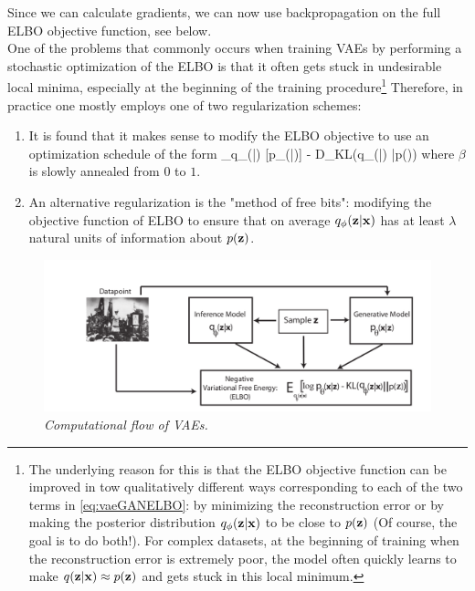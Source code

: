 Since we can calculate gradients, we can now use backpropagation on the full ELBO objective function, see below.\\
One of the problems that commonly occurs when training VAEs by performing a stochastic optimization of the ELBO is that it often gets stuck in undesirable local minima, especially at the beginning of the training procedure\footnote{The underlying reason for this is that the ELBO objective function can be improved in tow qualitatively different ways corresponding to each of the two terms in \ref{eq:vaeGANELBO}: by minimizing the reconstruction error or by making the posterior distribution $q_\phi(\mathbf{z}|\mathbf{x})$ to be close to $p(\mathbf{z})$ (Of course, the goal is to do both!). For complex datasets, at the beginning of training when the reconstruction error is extremely poor, the model often quickly learns to make $q(\mathbf{z} |\mathbf{x}) \approx p(\mathbf{z})$ and gets stuck in this local minimum.} Therefore, in practice one mostly employs one of two regularization schemes:
\begin{enumerate}
	\item It is found that it makes sense to modify the ELBO objective to use an optimization schedule of the form
\bse 
{}_{q_\phi(\mz|\mx)} [\log p_\theta(\mx |\mz)] - \beta D_{KL}(q_\phi(\mz|\mx) |p(\mz))
\ese 
where $\beta$ is slowly annealed from $0$ to $1$.
\item  An alternative regularization is the "method of free bits": modifying the objective function of ELBO to ensure that on average $q_\phi(\mathbf{z}|\mathbf{x})$ has at least $\lambda$ natural units of information about $p(\mathbf{z})$.
\end{enumerate}


\begin{figure}[h!]
	\centering
	\includegraphics[width=0.7\linewidth]{gfx/vae2}
	\caption{\itshape Computational flow of VAEs.}
	\label{fig:vae2}
\end{figure}
